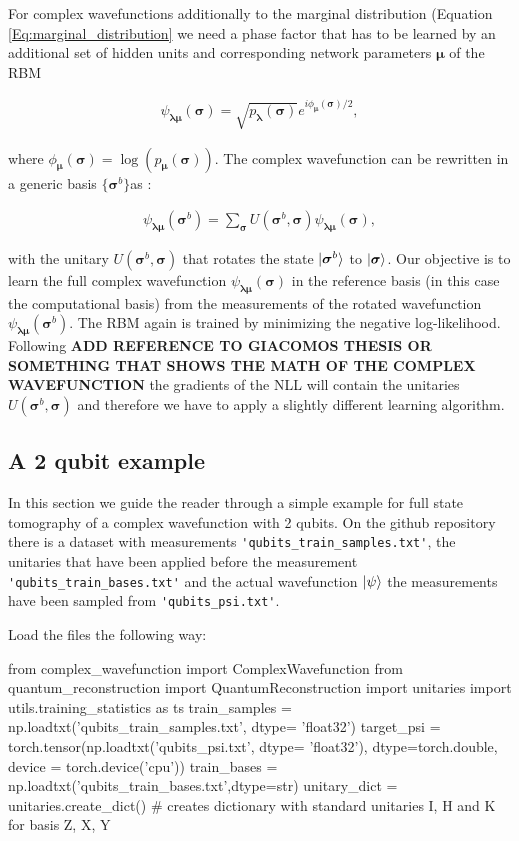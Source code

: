 \documentclass[submission, Phys]{SciPost}
\begin{document}
For complex wavefunctions additionally to the marginal distribution (Equation \ref{Eq:marginal_distribution} we need a phase factor that has to be learned by an additional set of hidden units and corresponding network parameters $\bm{\mu}$ of the RBM

\begin{align}
\psi_{\bm{\lambda} \bm{\mu}} (\bm{\sigma})= \sqrt{p_{\bm{\lambda}} (\bm{\sigma})} e^{i \phi_{\bm{\mu}} (\bm{\sigma})/2},
\end{align}

where $\phi_{\bm{\mu}}(\bm{\sigma}) = \log (p_{\bm{\mu}} (\bm{\sigma}))$. The complex wavefunction can be rewritten in a generic basis $\{ \bm{\sigma}^b \}$as :

\begin{align}
\psi_{\bm{\lambda} \bm{\mu}} (\bm{\sigma}^b)= \sum_{\bm{\sigma}} U (\bm{\sigma}^b, \bm{\sigma}) \psi_{\bm{\lambda} \bm{\mu}} (\bm{\sigma}),
\end{align}

with the unitary $U (\bm{\sigma}^b, \bm{\sigma})$ that rotates the state $\ket{\bm{\sigma}^b}$ to $\ket{\bm{\sigma}}$. Our objective is to learn the full complex wavefunction $\psi_{\bm{\lambda} \bm{\mu}} (\bm{\sigma})$ in the reference basis (in this case the computational basis) from the measurements of the rotated wavefunction $\psi_{\bm{\lambda} \bm{\mu}} (\bm{\sigma}^b)$.
The RBM again is trained by minimizing the negative log-likelihood. Following \cite{} \textbf{ADD REFERENCE TO GIACOMOS THESIS OR SOMETHING THAT SHOWS THE MATH OF THE COMPLEX WAVEFUNCTION} the gradients of the NLL will contain the unitaries $U (\bm{\sigma}^b, \bm{\sigma})$ and therefore we have to apply a slightly different learning algorithm.

\subsection{A 2 qubit example}

In this section we guide the reader through a simple example for full state tomography of a complex wavefunction with 2 qubits. On the github repository there is a dataset with measurements \verb|'qubits_train_samples.txt'|, the unitaries that have been applied before the measurement \verb|'qubits_train_bases.txt'| and the actual wavefunction $\ket{\psi}$ the measurements have been sampled from \verb|'qubits_psi.txt'|.

Load the files the following way:

\begin{python}
from complex_wavefunction import ComplexWavefunction
from quantum_reconstruction import QuantumReconstruction
import unitaries
import utils.training_statistics as ts
train_samples = np.loadtxt('qubits_train_samples.txt', dtype= 'float32')
target_psi  = torch.tensor(np.loadtxt('qubits_psi.txt', dtype= 'float32'), dtype=torch.double, device = torch.device('cpu'))
train_bases = np.loadtxt('qubits_train_bases.txt',dtype=str)
unitary_dict = unitaries.create_dict() # creates dictionary with standard unitaries I, H and K for basis Z, X, Y
\end{python}
\end{document}
